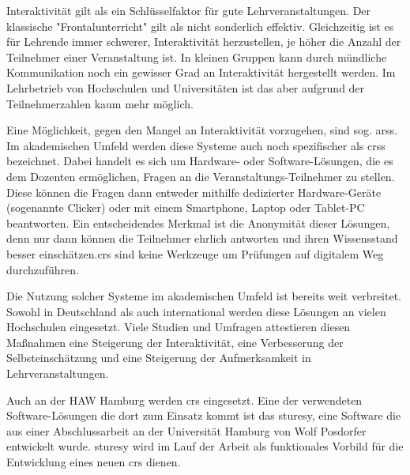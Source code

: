 Interaktivität gilt als ein Schlüsselfaktor für gute Lehrveranstaltungen. Der klassische "Frontalunterricht" gilt als nicht sonderlich effektiv. Gleichzeitig ist es für Lehrende immer schwerer, Interaktivität herzustellen, je höher die Anzahl der Teilnehmer einer Veranstaltung ist. In kleinen Gruppen kann durch mündliche Kommunikation noch ein gewisser Grad an Interaktivität hergestellt werden. Im Lehrbetrieb von Hochschulen und Universitäten ist das aber aufgrund der Teilnehmerzahlen kaum mehr möglich.

Eine Möglichkeit, gegen den Mangel an Interaktivität vorzugehen, sind sog. \acp{ars}. Im akademischen Umfeld werden diese Systeme auch noch spezifischer als \acp{crs} bezeichnet. Dabei handelt es sich um Hardware- oder Software-Lösungen, die es dem Dozenten ermöglichen, Fragen an die Veranstaltungs-Teilnehmer zu stellen. Diese können die Fragen dann entweder mithilfe dedizierter Hardware-Geräte (sogenannte Clicker) oder mit einem Smartphone, Laptop oder Tablet-PC beantworten. Ein entscheidendes Merkmal ist die Anonymität dieser Lösungen, denn nur dann können die Teilnehmer ehrlich antworten und ihren Wissensstand besser einschätzen.\ac{crs} sind keine Werkzeuge um Prüfungen auf digitalem Weg durchzuführen.


Die Nutzung solcher Systeme im akademischen Umfeld ist bereits weit verbreitet. Sowohl in Deutschland als auch international werden diese Lösungen an vielen Hochschulen eingesetzt. Viele Studien und Umfragen attestieren diesen Maßnahmen eine Steigerung der Interaktivität, eine Verbesserung der Selbsteinschätzung und eine Steigerung der Aufmerksamkeit in Lehrveranstaltungen.

Auch an der HAW Hamburg werden \ac{crs} eingesetzt. Eine der verwendeten Software-Lösungen die dort zum Einsatz kommt ist das \ac{sturesy}, eine Software die aus einer Abschlussarbeit an der Universität Hamburg von Wolf Posdorfer entwickelt wurde. \ac{sturesy} wird im Lauf der Arbeit als funktionales Vorbild für die Entwicklung eines neuen \ac{crs} dienen.